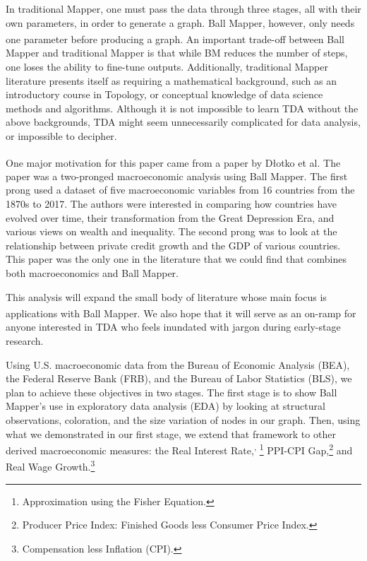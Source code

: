 \documentclass[
  10pt,
  letterpaper,
  DIV=11,
  numbers=noendperiod]{scrartcl}
\begin{document}
In traditional Mapper, one must pass the data through three stages, all
with their own parameters, in order to generate a graph. Ball Mapper,
however, only needs one parameter before producing a
graph.\textsuperscript{} An
important trade-off between Ball Mapper and traditional Mapper is that
while BM reduces the number of steps, one loses the ability to fine-tune
outputs. Additionally, traditional Mapper literature presents itself as
requiring a mathematical background, such as an introductory course in
Topology, or conceptual knowledge of data science methods and
algorithms. Although it is not impossible to learn TDA without the above
backgrounds, TDA might seem unnecessarily complicated for data analysis,
or impossible to decipher.

One major motivation for this paper came from a paper by D\l{}otko et
al.\textsuperscript{} The
paper was a two-pronged macroeconomic analysis using Ball Mapper. The
first prong used a dataset of five macroeconomic variables from 16
countries from the 1870s to 2017. The authors were interested in
comparing how countries have evolved over time, their transformation
from the Great Depression Era, and various views on wealth and
inequality. The second prong was to look at the relationship between
private credit growth and the GDP of various countries. This paper was
the only one in the literature that we could find that combines both
macroeconomics and Ball Mapper.

This analysis will expand the small body of literature whose main focus
is applications with Ball
Mapper.\textsuperscript{} We
also hope that it will serve as an on-ramp for anyone interested in TDA
who feels inundated with jargon during early-stage research.

Using U.S. macroeconomic data from the Bureau of Economic Analysis
(BEA), the Federal Reserve Bank (FRB), and the Bureau of Labor
Statistics (BLS), we plan to achieve these objectives in two stages. The
first stage is to show Ball Mapper's use in exploratory data analysis
(EDA) by looking at structural observations, coloration, and the size
variation of nodes in our graph. Then, using what we demonstrated in our
first stage, we extend that framework to other derived macroeconomic
measures: the Real Interest
Rate,\textsuperscript{,
}\footnote{Approximation using the Fisher Equation.}
PPI-CPI
Gap,\textsuperscript{}\footnote{Producer Price Index: Finished Goods less Consumer Price Index.}
and Real Wage
Growth.\textsuperscript{}\footnote{Compensation less Inflation (CPI).}
\end{document}
